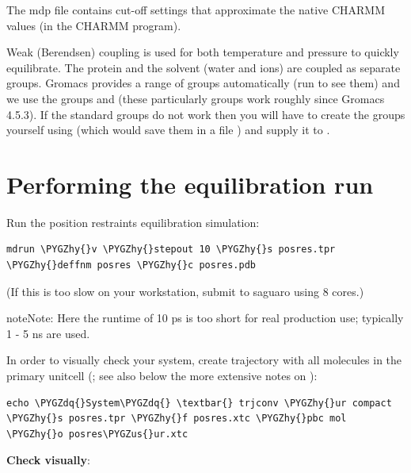 \documentclass[letterpaper,10pt,english]{sphinxmanual}
\def\PYGZus{\char`\_}
\def\PYGZhy{\char`\-}
\def\PYGZdq{\char`\"}
\begin{document}
The mdp file contains cut-off settings that approximate the native
CHARMM values (in the CHARMM program).

Weak (Berendsen) coupling is used for both temperature and pressure to
quickly equilibrate. The protein and the solvent (water and ions) are
coupled as separate groups. Gromacs provides a range of groups
automatically (run  to see them) and we use
the groups  and  (these particularly groups
work roughly since Gromacs 4.5.3). If the standard groups do not work
then you will have to create the groups yourself using  (which would save them in a file ) and
supply it to .


\section{Performing the equilibration run}
\label{position_restraints_MD:performing-the-equilibration-run}
Run the position restraints equilibration simulation:

\begin{Verbatim}[commandchars=\\\{\}]
mdrun \PYGZhy{}v \PYGZhy{}stepout 10 \PYGZhy{}s posres.tpr \PYGZhy{}deffnm posres \PYGZhy{}c posres.pdb
\end{Verbatim}

(If this is too slow on your workstation, submit to saguaro using 8
cores.)

\begin{notice}{note}{Note:}
Here the runtime of 10 ps is too short for real production
use; typically 1 - 5 ns are used.
\end{notice}

In order to visually check your system, create trajectory with all
molecules in the primary unitcell (; see also below the
more extensive notes on {\hyperref[trajectory_visualization:trajectory-visualization]{\emph{}}}):

\begin{Verbatim}[commandchars=\\\{\}]
echo \PYGZdq{}System\PYGZdq{} \textbar{} trjconv \PYGZhy{}ur compact \PYGZhy{}s posres.tpr \PYGZhy{}f posres.xtc \PYGZhy{}pbc mol \PYGZhy{}o posres\PYGZus{}ur.xtc
\end{Verbatim}

\textbf{Check visually}:
\end{document}
